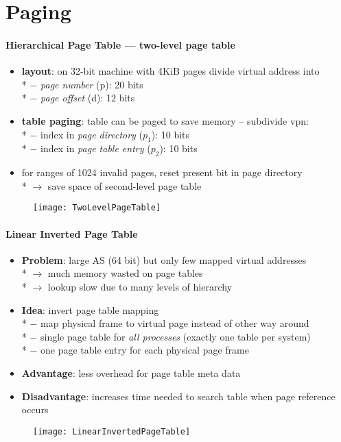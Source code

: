 \section{Paging}

\paragraph{Hierarchical Page Table --- two-level page table}
\begin{itemize}
  \item \textbf{layout}: on 32-bit machine with 4KiB pages divide virtual address into \\*
    $ - $ \emph{page number} (p): 20 bits \\*
    $ - $ \emph{page offset} (d): 12 bits
  \item \textbf{table paging}: table can be paged to save memory -- subdivide vpn: \\*
    $ - $ index in \emph{page directory} ($ p_1 $): 10 bits \\*
    $ - $ index in \emph{page table entry} ($ p_2 $): 10 bits
  \item for ranges of 1024 invalid pages, reset present bit in page directory \\*
    $ \to $ save space of second-level page table
\end{itemize}
\begin{figure}[h]\centering\label{TwoLevelPageTable}\texttt{[image: TwoLevelPageTable]}\end{figure}

\paragraph{Linear Inverted Page Table}
\begin{itemize}
  \item \textbf{Problem}: large AS (64 bit) but only few mapped virtual addresses \\*
    $ \to $ much memory wasted on page tables \\*
    $ \to $ lookup slow due to many levels of hierarchy
  \item \textbf{Idea}: invert page table mapping \\*
    $ - $ map physical frame to virtual page instead of other way around \\*
    $ - $ single page table for \emph{all processes} (exactly one table per system) \\*
    $ - $ one page table entry for each physical page frame
  \item \textbf{Advantage}: less overhead for page table meta data
  \item \textbf{Disadvantage}: increases time needed to search table when page reference occurs
\end{itemize}
\begin{figure}[h]\centering\label{LinearInvertedPageTable}\texttt{[image: LinearInvertedPageTable]}\end{figure}


